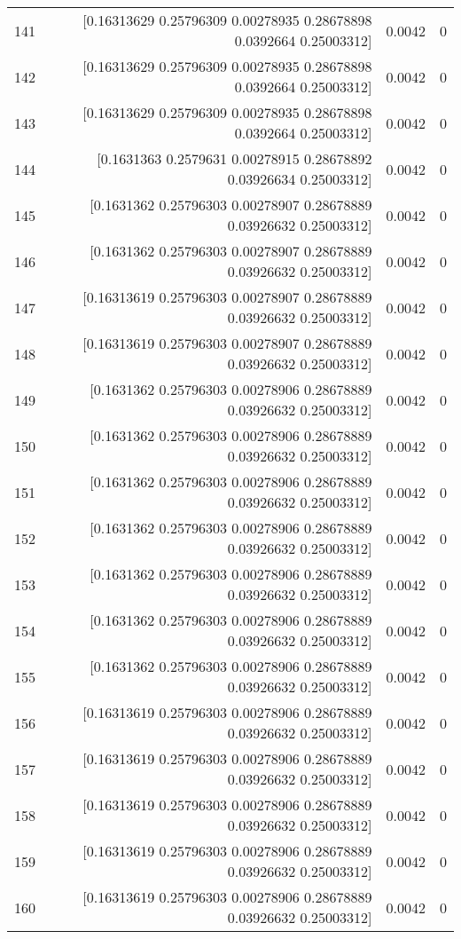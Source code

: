 \begin{longtable}{lrrr}
141 & [0.16313629 0.25796309 0.00278935 0.28678898 0.0392664  0.25003312] & 0.0042 & 0 \\
142 & [0.16313629 0.25796309 0.00278935 0.28678898 0.0392664  0.25003312] & 0.0042 & 0 \\
143 & [0.16313629 0.25796309 0.00278935 0.28678898 0.0392664  0.25003312] & 0.0042 & 0 \\
144 & [0.1631363  0.2579631  0.00278915 0.28678892 0.03926634 0.25003312] & 0.0042 & 0 \\
145 & [0.1631362  0.25796303 0.00278907 0.28678889 0.03926632 0.25003312] & 0.0042 & 0 \\
146 & [0.1631362  0.25796303 0.00278907 0.28678889 0.03926632 0.25003312] & 0.0042 & 0 \\
147 & [0.16313619 0.25796303 0.00278907 0.28678889 0.03926632 0.25003312] & 0.0042 & 0 \\
148 & [0.16313619 0.25796303 0.00278907 0.28678889 0.03926632 0.25003312] & 0.0042 & 0 \\
149 & [0.1631362  0.25796303 0.00278906 0.28678889 0.03926632 0.25003312] & 0.0042 & 0 \\
150 & [0.1631362  0.25796303 0.00278906 0.28678889 0.03926632 0.25003312] & 0.0042 & 0 \\
151 & [0.1631362  0.25796303 0.00278906 0.28678889 0.03926632 0.25003312] & 0.0042 & 0 \\
152 & [0.1631362  0.25796303 0.00278906 0.28678889 0.03926632 0.25003312] & 0.0042 & 0 \\
153 & [0.1631362  0.25796303 0.00278906 0.28678889 0.03926632 0.25003312] & 0.0042 & 0 \\
154 & [0.1631362  0.25796303 0.00278906 0.28678889 0.03926632 0.25003312] & 0.0042 & 0 \\
155 & [0.1631362  0.25796303 0.00278906 0.28678889 0.03926632 0.25003312] & 0.0042 & 0 \\
156 & [0.16313619 0.25796303 0.00278906 0.28678889 0.03926632 0.25003312] & 0.0042 & 0 \\
157 & [0.16313619 0.25796303 0.00278906 0.28678889 0.03926632 0.25003312] & 0.0042 & 0 \\
158 & [0.16313619 0.25796303 0.00278906 0.28678889 0.03926632 0.25003312] & 0.0042 & 0 \\
159 & [0.16313619 0.25796303 0.00278906 0.28678889 0.03926632 0.25003312] & 0.0042 & 0 \\
160 & [0.16313619 0.25796303 0.00278906 0.28678889 0.03926632 0.25003312] & 0.0042 & 0 \\

\end{longtable}
